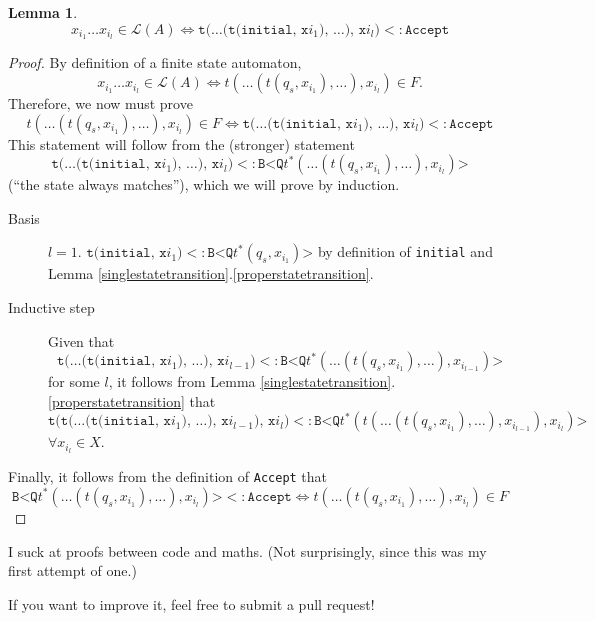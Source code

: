 \documentclass[a4paper, 11pt]{article}
\newcommand{\code}[1]{\texttt{#1}}
\theoremstyle{definition}
\newtheorem{lemma}{Lemma}
\begin{document}
\begin{lemma}\label{statetransitions}
\[
x_{i_1}\ldots x_{i_l} \in \mathcal{L}(A) \iff \code{t(\ldots (t(initial, x$i_1$), \ldots), x$i_l$)} <: \code{Accept}
\]
\begin{proof}
By definition of a finite state automaton,
\[x_{i_1}\ldots x_{i_l} \in \mathcal{L}(A) \iff t(\ldots (t(q_s, x_{i_1}), \ldots), x_{i_l})\in F.\]
Therefore, we now must prove
\[t(\ldots (t(q_s, x_{i_1}), \ldots), x_{i_l})\in F \iff \code{t(\ldots (t(initial, x$i_1$), \ldots), x$i_l$)} <: \code{Accept}\]
This statement will follow from the (stronger) statement
\[\code{t(\ldots (t(initial, x$i_1$), \ldots), x$i_l$)} <: \code{B<Q}t^\ast(\ldots (t(q_s, x_{i_1}), \ldots), x_{i_l})\code{>}\]
(“the state always matches”), which we will prove by induction.
\begin{description}
\item[Basis] $l=1$. $\code{t(initial, x}i_1\code{)} <: \code{B<Q}t^\ast(q_s, x_{i_1})\code{>}$ by definition of \code{initial} and Lemma \ref{singlestatetransition}.\ref{properstatetransition}.
\item[Inductive step]
Given that 
\[\code{t(\ldots (t(initial, x}i_1\code{), \ldots), x}i_{l-1}\code{)} <: \code{B<Q}t^\ast(\ldots (t(q_s, x_{i_1}), \ldots), x_{i_{l-1}})\code{>}\]
for some $l$, it follows from Lemma \ref{singlestatetransition}.\ref{properstatetransition} that
\[\code{t(t(\ldots (t(initial, x$i_1$), \ldots), x$i_{l-1}$), x$i_l$)} <: \code{B<Q}t^\ast(t(\ldots (t(q_s, x_{i_1}), \ldots), x_{i_{l-1}}), x_{i_l})\code{>}\]
$\forall x_{i_l} \in X$.
\end{description}
Finally, it follows from the definition of \code{Accept} that
\[\code{B<Q}t^\ast(\ldots(t(q_s, x_{i_1}), \ldots), x_{i_l})\code{>}<:\code{Accept} \iff t(\ldots(t(q_s, x_{i_1}), \ldots), x_{i_l}) \in F\]
\end{proof}
I suck at proofs between code and maths. (Not surprisingly, since this was my first attempt of one.)

If you want to improve it, feel free to submit a pull request!
\end{lemma}
\end{document}
